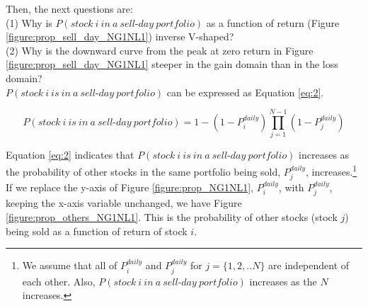 \documentclass[11pt, a4paper]{article}
\begin{document}

Then, the next questions are:\\
(1) Why is $P(stock~i~in~a~sell\mbox{-}day~portfolio)$ as a function of return (Figure \ref{figure:prop_sell_day_NG1NL1}) inverse V-shaped?\\
(2) Why is the downward curve from the peak at zero return in Figure \ref{figure:prop_sell_day_NG1NL1} steeper in the gain domain than in the loss domain?\\


$P(stock~i~is~in~a~sell\mbox{-}day~portfolio)$ can be expressed as Equation \ref{eq:2}.%

\begin{equation}
\label{eq:2}
P(stock~i~is~in~a~sell\mbox{-}day~portfolio) =1-(1-P^{daily}_{i})\prod_{j=1}^{N-1}(1-P^{daily}_{j})
\end{equation}

Equation \ref{eq:2} indicates that $P(stock~i~is~in~a~sell\mbox{-}day~portfolio)$ increases as the probability of other stocks in the same portfolio being sold, $P^{daily}_{j}$, increases.\footnote{We assume that all of $P^{daily}_{i}$ and $P^{daily}_{j}$ for $j=\{1,2,..N\}$ are independent of each other. Also, $P(stock~i~in~a~sell\mbox{-}day~portfolio)$ increases as the $N$ increases.}\\

If we replace the y-axis of Figure \ref{figure:prop_NG1NL1}, $P^{daily}_{i}$, with $P^{daily}_{j}$, keeping the x-axis variable unchanged, we have Figure \ref{figure:prop_others_NG1NL1}. This is the probability of other stocks (stock $j$) being sold as a function of return of stock $i$.
\end{document}
